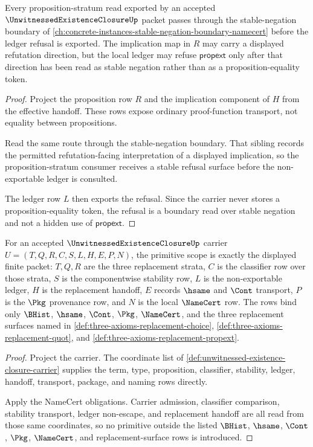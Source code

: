 \begin{theorem}
\label{thm:unwitnessed-existence-closure-refutation-boundary-link}
Every proposition-stratum read exported by an accepted $\UnwitnessedExistenceClosureUp$ packet passes through the stable-negation boundary of \autoref{ch:concrete-instances-stable-negation-boundary-namecert} before the ledger refusal is exported. The implication map in $R$ may carry a displayed refutation direction, but the local ledger may refuse $\mathsf{propext}$ only after that direction has been read as stable negation rather than as a proposition-equality token.
\end{theorem}
\begin{proof}
Project the proposition row $R$ and the implication component of $H$ from the effective handoff. These rows expose ordinary proof-function transport, not equality between propositions.

Read the same route through the stable-negation boundary. That sibling records the permitted refutation-facing interpretation of a displayed implication, so the proposition-stratum consumer receives a stable refusal surface before the non-exportable ledger is consulted.

The ledger row $L$ then exports the refusal. Since the carrier never stores a proposition-equality token, the refusal is a boundary read over stable negation and not a hidden use of $\mathsf{propext}$.
\end{proof}

\begin{theorem}
\label{thm:unwitnessed-existence-closure-primitive-scope}
For an accepted $\UnwitnessedExistenceClosureUp$ carrier $U=(T,Q,R,C,S,L,H,E,P,N)$, the primitive scope is exactly the displayed finite packet: $T,Q,R$ are the three replacement strata, $C$ is the classifier row over those strata, $S$ is the componentwise stability row, $L$ is the non-exportable ledger, $H$ is the replacement handoff, $E$ records $\hsame$ and $\Cont$ transport, $P$ is the $\Pkg$ provenance row, and $N$ is the local $\NameCert$ row. The rows bind only $\BHist$, $\hsame$, $\Cont$, $\Pkg$, $\NameCert$, and the three replacement surfaces named in \autoref{def:three-axioms-replacement-choice}, \autoref{def:three-axioms-replacement-quot}, and \autoref{def:three-axioms-replacement-propext}.
\end{theorem}
\begin{proof}
Project the carrier. The coordinate list of \autoref{def:unwitnessed-existence-closure-carrier} supplies the term, type, proposition, classifier, stability, ledger, handoff, transport, package, and naming rows directly.

Apply the NameCert obligations. Carrier admission, classifier comparison, stability transport, ledger non-escape, and replacement handoff are all read from those same coordinates, so no primitive outside the listed $\BHist$, $\hsame$, $\Cont$, $\Pkg$, $\NameCert$, and replacement-surface rows is introduced.
\end{proof}

